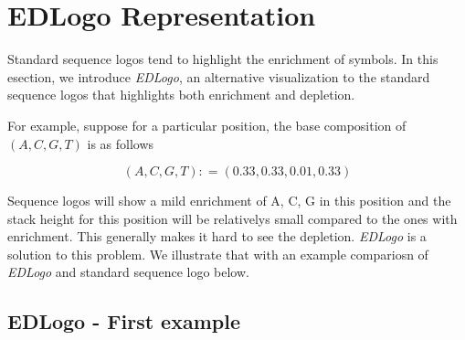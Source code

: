 \documentclass[12pt]{article}\usepackage[]{graphicx}\usepackage[usenames,dvipsnames]{color}
\begin{document}
\section{EDLogo Representation}

Standard sequence logos tend to highlight the enrichment of symbols. In this esection, we introduce \textit{EDLogo}, an alternative visualization to the standard sequence logos that highlights both enrichment and depletion.

For example, suppose for a particular position, the base composition of $ \left (A, C, G, T \right)$ is as follows

$$ \left (A, C, G, T \right ) : = \left ( 0.33, 0.33, 0.01, 0.33 \right )  $$

Sequence logos will show a mild enrichment of A, C, G in this position and the stack height for this position will be relativelys small compared to the ones with enrichment. This generally makes it hard to see the depletion. \textit{EDLogo} is a solution to this problem. We illustrate that with an example compariosn of \textit{EDLogo} and standard sequence logo below.

\subsection{EDLogo - First example}
\end{document}
